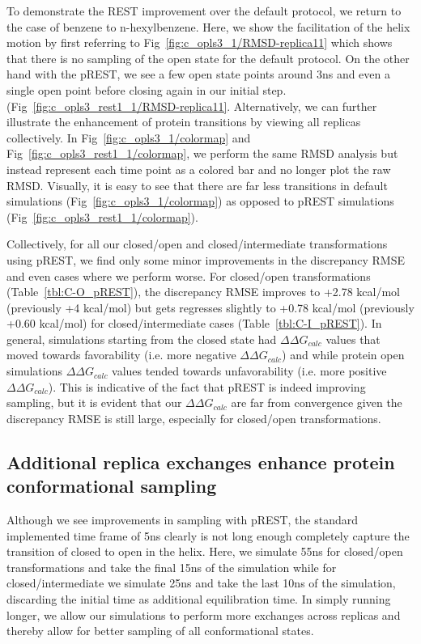 \documentclass[journal=jctcce,manuscript=article]{achemso}
\begin{document}
To demonstrate the REST improvement over the default protocol, we return to the case of benzene to n-hexylbenzene.
Here, we show the facilitation of the helix motion by first referring to Fig~\ref{fig:c_opls3_1/RMSD-replica11} which shows that there is no sampling of the open state for the default protocol.
On the other hand with the pREST, we see a few open state points around 3ns and even a single open point before closing again in our initial step. (Fig~\ref{fig:c_opls3_rest1_1/RMSD-replica11}.
Alternatively, we can further illustrate the enhancement of protein transitions by viewing all replicas collectively. 
In Fig~\ref{fig:c_opls3_1/colormap} and Fig~\ref{fig:c_opls3_rest1_1/colormap}, we perform the same RMSD analysis but instead represent each time point as a colored bar and no longer plot the raw RMSD.
Visually, it is easy to see that there are far less transitions in default simulations (Fig~\ref{fig:c_opls3_1/colormap}) as opposed to pREST simulations (Fig~\ref{fig:c_opls3_rest1_1/colormap}).
 
Collectively, for all our closed/open and closed/intermediate transformations using pREST, we find only some minor improvements in the discrepancy RMSE and even cases where we perform worse.
For closed/open transformations (Table~\ref{tbl:C-O_pREST}), the discrepancy RMSE improves to +2.78 kcal/mol (previously +4 kcal/mol) but gets regresses slightly to +0.78 kcal/mol (previously +0.60 kcal/mol) for closed/intermediate cases (Table~\ref{tbl:C-I_pREST}).
In general, simulations starting from the closed state had $\Delta\Delta G_{calc}$ values that moved towards favorability (i.e. more negative $\Delta\Delta G_{calc}$) and while protein open simulations $\Delta\Delta G_{calc}$ values tended towards unfavorability (i.e. more positive $\Delta\Delta G_{calc}$).
This is indicative of the fact that pREST is indeed improving sampling, but it is evident that our $\Delta\Delta G_{calc}$ are far from convergence given the discrepancy RMSE is still large, especially for closed/open transformations.

\subsection*{Additional replica exchanges enhance protein conformational sampling}
Although we see improvements in sampling with pREST, the standard implemented time frame of 5ns clearly is not long enough completely capture the transition of closed to open in the helix.
Here, we simulate 55ns for closed/open transformations and take the final 15ns of the simulation while for closed/intermediate we simulate 25ns and take the last 10ns of the simulation, discarding the initial time as additional equilibration time.
In simply running longer, we allow our simulations to perform more exchanges across replicas and thereby allow for better sampling of all conformational states.
\end{document}
